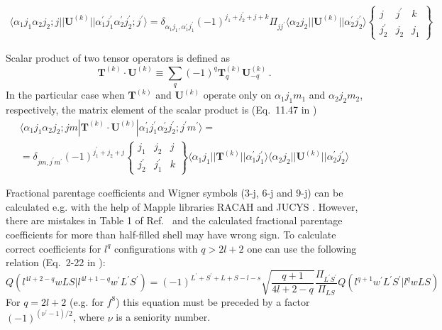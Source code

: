 \documentclass[a4paper,oneside,12pt]{extarticle}
\begin{document}
\begin{multline}
\langle \alpha_1 j_1 \alpha_2 j_2; j || \mathbf{U}^{(k)} || \alpha_1^{\prime} j_1^{\prime} \alpha_2^{\prime} j_2^{\prime}; j^{\prime} \rangle =
\delta_{\alpha_1 j_1, \alpha_1^{\prime} j_1^{\prime}} (-1)^{j_1 + j_2^{\prime} + j + k} \Pi_{j j^{\prime}}
\langle \alpha_2 j_2 || \mathbf{U}^{(k)} || \alpha_2^{\prime} j_2^{\prime} \rangle
\left \{
\begin{array}{ccc}
j & j^{\prime} & k \\
j_2^{\prime} & j_2 & j_1
\end{array}
\right \}
\label{eq:Uk2}
\end{multline}
%

Scalar product of two tensor operators is defined as
$$
\mathbf{T}^{(k)} \cdot \mathbf{U}^{(k)} \equiv
\sum_q (-1)^q \mathbf{T}^{(k)}_q \mathbf{U}^{(k)}_{-q} \,.
$$
%
In the particular case when $\mathbf{T}^{(k)}$ and $\mathbf{U}^{(k)}$ operate only on $\alpha_1 j_1 m_1$ and $\alpha_2 j_2 m_2$, respectively, the matrix element of the scalar product is (Eq.~11.47 in \cite{Cowan})
%
\begin{multline}
\langle \alpha_1 j_1 \alpha_2 j_2; jm | \mathbf{T}^{(k)} \cdot \mathbf{U}^{(k)} | \alpha_1^{\prime} j_1^{\prime} \alpha_2^{\prime} j_2^{\prime}; j^{\prime}m^{\prime} \rangle = \\ =
\delta_{jm, j^{\prime}m^{\prime}} (-1)^{j_1^{\prime} + j_2 + j} 
\left \{
\begin{array}{ccc}
j_1 & j_2 & j \\
j_2^{\prime} & j_1^{\prime} & k
\end{array}
\right \}
\langle \alpha_1 j_1 || \mathbf{T}^{(k)} || \alpha_1^{\prime} j_1^{\prime} \rangle
\langle \alpha_2 j_2 || \mathbf{U}^{(k)} || \alpha_2^{\prime} j_2^{\prime} \rangle
\label{eq:TU}
\end{multline}

Fractional parentage coefficients and Wigner symbols (3-j, 6-j and 9-j) can be calculated e.g. with the help of Mapple libraries RACAH and JUCYS \cite{Gaigalas_2001}. However, there are mistakes in Table 1 of Ref.~\cite{Gaigalas_2001} and the calculated fractional parentage coefficients for more than half-filled shell may have wrong sign. To calculate correct coefficients for $l^q$ configurations with $q>2l+2$ one can use the following relation (Eq.~2-22 in \cite{Wybourne}):
$$
Q(l^{4l+2-q} wLS|l^{4l+1-q} w^{\prime}L^{\prime} S^{\prime}) = 
(-1)^{L^{\prime}+S^{\prime}+L+S-l-s}
\sqrt{\frac{q+1}{4l+2-q}} \frac{\Pi_{L^{\prime} S^{\prime}}}{\Pi_{LS}}
Q(l^{q+1} w^{\prime}L^{\prime} S^{\prime}|l^q wLS)
$$
For $q=2l+2$ (e.g. for $f^8$) this equation must be preceded by a factor $(-1)^{(\nu^{\prime}-1)/2}$, where $\nu$ is a seniority number.
\end{document}

